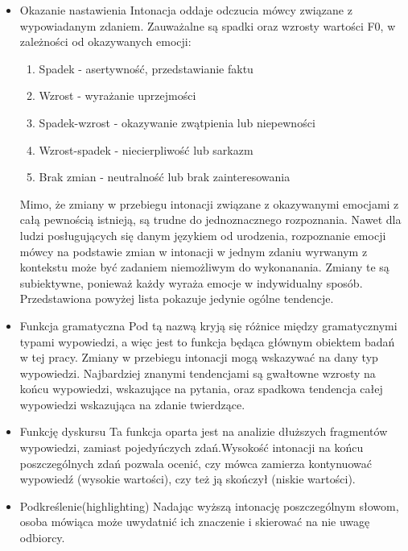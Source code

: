 \documentclass[a4paper,12 pt]{article}
\begin{document}
\begin{itemize}
\item{Okazanie nastawienia} 
\leavevmode
\newline
Intonacja oddaje odczucia mówcy związane z wypowiadanym zdaniem. Zauważalne są spadki oraz wzrosty wartości F0, w zależności od okazywanych emocji:
\begin{enumerate}
\item{Spadek - asertywność, przedstawianie faktu}
\item{Wzrost - wyrażanie uprzejmości}
\item{Spadek-wzrost - okazywanie zwątpienia lub niepewności}
\item{Wzrost-spadek - niecierpliwość lub sarkazm}
\item{Brak zmian - neutralność lub brak zainteresowania}
\end{enumerate}
Mimo, że zmiany w przebiegu intonacji związane z okazywanymi emocjami z całą pewnością istnieją, są trudne do jednoznacznego rozpoznania. Nawet dla ludzi posługujących się danym językiem od urodzenia, rozpoznanie emocji mówcy na podstawie zmian w intonacji w jednym zdaniu wyrwanym z kontekstu może być zadaniem niemożliwym do wykonanania. Zmiany te są subiektywne, ponieważ każdy wyraża emocje w indywidualny sposób. Przedstawiona powyżej lista pokazuje jedynie ogólne tendencje.
\item{Funkcja gramatyczna}
\leavevmode
\newline
Pod tą nazwą kryją się różnice między gramatycznymi typami wypowiedzi, a więc jest to funkcja będąca głównym obiektem badań w tej pracy. Zmiany w przebiegu intonacji mogą wskazywać na dany typ wypowiedzi. Najbardziej znanymi tendencjami są gwałtowne wzrosty na końcu wypowiedzi, wskazujące na pytania, oraz spadkowa tendencja całej wypowiedzi wskazująca na zdanie twierdzące.
\item{Funkcję dyskursu} 
\leavevmode
\newline
Ta funkcja oparta jest na analizie dłuższych fragmentów wypowiedzi, zamiast pojedyńczych zdań.Wysokość intonacji na końcu poszczególnych zdań pozwala ocenić, czy mówca zamierza kontynuować wypowiedź (wysokie wartości), czy też ją skończył (niskie wartości).

\item{Podkreślenie(highlighting)}
\leavevmode
\newline
Nadając wyższą intonację poszczególnym słowom, osoba mówiąca może uwydatnić ich znaczenie i skierować na nie uwagę odbiorcy.
\end{itemize}
\end{document}
